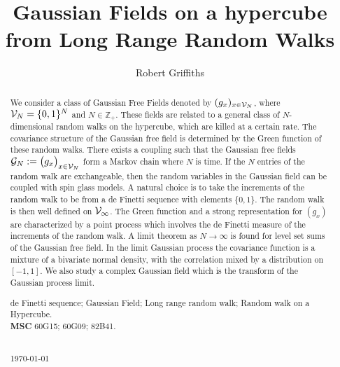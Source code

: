 \documentclass[preprint,11pt]{elsarticle}
\theoremstyle{remark}
\begin{document}
\begin{frontmatter}
\title{Gaussian Fields on a hypercube\\from Long Range Random Walks}
%   
 \author{Robert Griffiths}

%

	
%	
%
\date{}



\begin{abstract}
We consider a class of  Gaussian Free Fields  denoted by $(g_x)_{x \in {\cal V}_N}$,  where $ {\cal V}_N = \{0,1\}^N$ and $N\in \mathbb{Z}_+$. 
These fields are related to a general class of $N$-dimensional random walks on the hypercube, which are killed at a certain rate. The covariance structure of the Gaussian free field is determined by the Green function of these random walks. 
There exists a coupling such that the Gaussian free fields  ${\cal G}_N := \big (g_{x}\big )_{x \in {\cal V}_N}$  form a Markov chain where $N$ is time.
 If the $N$ entries of the random walk are exchangeable, then the random variables in the Gaussian field can be coupled with spin glass models.
A natural choice is to take the increments of the random walk to be from a de Finetti sequence with elements $\{0,1\}$. The random walk is then well defined on ${\cal V}_\infty$. The Green function and a strong representation for $(g_x)$ are characterized by a point process which involves the de Finetti measure of the increments of the random walk. 
%
A limit theorem as $N\to \infty$ is found for level set sums of the Gaussian free field.
 In the limit Gaussian process
the covariance function is a mixture of a bivariate normal density, with the correlation mixed by a distribution on $[-1,1]$.
We also study a complex Gaussian field which is the transform of the Gaussian process limit.\\
\begin{keywords} 
\phantom{;}de Finetti sequence; Gaussian Field; Long range random walk; Random walk on a Hypercube.\\[0.1cm]
\textbf{MSC} 60G15; 60G09; 82B41. 
\end{keywords}\\[0.1cm]
\today
\end{abstract}
%
\end{frontmatter}
\end{document}

